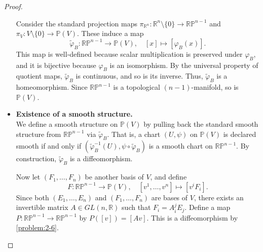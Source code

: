 \begin{problem}
\begin{proof}
\begin{itemize}
            Consider the standard projection maps $\pi_{\mathbb{R}^n} \colon \mathbb{R}^n \setminus \{0\} \to \mathbb{RP}^{n-1}$ and $\pi_V \colon V \setminus \{0\} \to \mathbb{P}(V)$. These induce a map
            \[
                \widetilde{\varphi}_B \colon \mathbb{RP}^{n-1} \to \mathbb{P}(V), \quad [x] \mapsto [\varphi_B(x)].
            \]
            This map is well-defined because scalar multiplication is preserved under $\varphi_B$, and it is bijective because $\varphi_B$ is an isomorphism. By the universal property of quotient maps, $\widetilde{\varphi}_B$ is continuous, and so is its inverse. Thus, $\widetilde{\varphi}_B$ is a homeomorphism. Since $\mathbb{RP}^{n-1}$ is a topological $(n-1)$-manifold, so is $\mathbb{P}(V)$.
            \item \textbf{Existence of a smooth structure.}\\
            We define a smooth structure on $\mathbb{P}(V)$ by pulling back the standard smooth structure from $\mathbb{RP}^{n-1}$ via $\widetilde{\varphi}_B$. That is, a chart $(U, \psi)$ on $\mathbb{P}(V)$ is declared smooth if and only if $(\widetilde{\varphi}_B^{-1}(U), \psi \circ \widetilde{\varphi}_B)$ is a smooth chart on $\mathbb{RP}^{n-1}$. By construction, $\widetilde{\varphi}_B$ is a diffeomorphism.

            Now let $(F_1, \dots, F_n)$ be another basis of $V$, and define
            \[
                F \colon \mathbb{RP}^{n-1} \to \mathbb{P}(V), \quad [v^1, \dots, v^n] \mapsto [v^i F_i].
            \]
            Since both $(E_1, \dots, E_n)$ and $(F_1, \dots, F_n)$ are bases of $V$, there exists an invertible matrix $A \in GL(n, \mathbb{R})$ such that $F_i = A^j_i E_j$. Define a map $P \colon \mathbb{RP}^{n-1} \to \mathbb{RP}^{n-1}$ by $P([v]) = [Av]$. This is a diffeomorphism by \cref{problem:2-6}.


\end{itemize}
\end{proof}
\end{problem}
